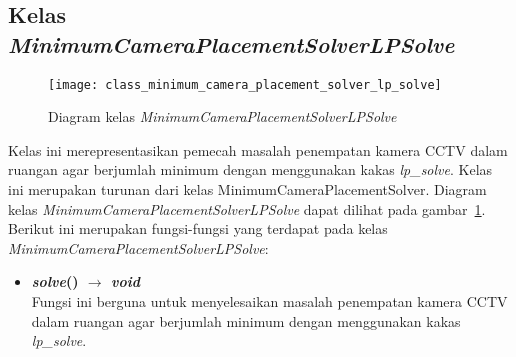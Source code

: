 \subsection{Kelas \textit{MinimumCameraPlacementSolverLPSolve}}
\begin{figure}[H]
	\centering  
	\texttt{[image: class\_minimum\_camera\_placement\_solver\_lp\_solve]}
	\caption[Diagram kelas \textit{MinimumCameraPlacementSolverLPSolve}]{Diagram kelas \textit{MinimumCameraPlacementSolverLPSolve}}
	\label{fig:class_minimum_camera_placement_solver_lp_solve}
\end{figure}

Kelas ini merepresentasikan pemecah masalah penempatan kamera CCTV dalam ruangan agar berjumlah minimum dengan menggunakan kakas \textit{lp{\_}solve}. Kelas ini merupakan turunan dari kelas MinimumCameraPlacementSolver. Diagram kelas \textit{MinimumCameraPlacementSolverLPSolve} dapat dilihat pada gambar~\ref{fig:class_minimum_camera_placement_solver_lp_solve}. Berikut ini merupakan fungsi-fungsi yang terdapat pada kelas \textit{MinimumCameraPlacementSolverLPSolve}:
\begin{itemize}
	\item \textbf{\textit{solve}() \(\rightarrow\) \textit{void}}\\
	Fungsi ini berguna untuk menyelesaikan masalah penempatan kamera CCTV dalam ruangan agar berjumlah minimum dengan menggunakan kakas \textit{lp{\_}solve}.
\end{itemize}











